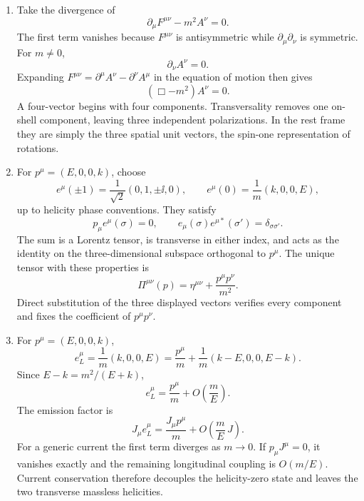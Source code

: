 \begin{enumerate}
\begin{enumerate}
\item
Take the divergence of
\[
 \partial_\mu F^{\mu\nu}-m^2A^\nu=0.
\]
The first term vanishes because \(F^{\mu\nu}\) is antisymmetric while
\(\partial_\mu\partial_\nu\) is symmetric.  For \(m\ne0\),
\[
 \partial_\nu A^\nu=0.
\]
Expanding \(F^{\mu\nu}=\partial^\mu A^\nu-\partial^\nu A^\mu\) in the
equation of motion then gives
\[
 (\Box-m^2)A^\nu=0.
\]
A four-vector begins with four components.  Transversality removes one
on-shell component, leaving three independent polarizations.  In the rest
frame they are simply the three spatial unit vectors, the spin-one
representation of rotations.
\item
For \(p^\mu=(E,0,0,k)\), choose
\[
 e^\mu(\pm1)=\frac1{\sqrt2}(0,1,\pm \ii,0),\qquad
 e^\mu(0)=\frac1m(k,0,0,E),
\]
up to helicity phase conventions.  They satisfy
\[
 p_\mu e^\mu(\sigma)=0,\qquad
 e_\mu(\sigma)e^{\mu *}(\sigma')=\delta_{\sigma\sigma'}.
\]
The sum is a Lorentz tensor, is transverse in either index, and acts as the
identity on the three-dimensional subspace orthogonal to \(p^\mu\).
The unique tensor with these properties is
\[
 \Pi^{\mu\nu}(p)=\eta^{\mu\nu}+\frac{p^\mu p^\nu}{m^2}.
\]
Direct substitution of the three displayed vectors verifies every
component and fixes the coefficient of \(p^\mu p^\nu\).
\item
For \(p^\mu=(E,0,0,k)\),
\[
 e_L^\mu=\frac1m(k,0,0,E)
 =\frac{p^\mu}{m}
 +\frac1m(k-E,0,0,E-k).
\]
Since \(E-k=m^2/(E+k)\),
\[
 e_L^\mu=\frac{p^\mu}{m}+O\!\left(\frac mE\right).
\]
The emission factor is
\[
 J_\mu e_L^\mu=\frac{J_\mu p^\mu}{m}
 +O\!\left(\frac mE\,J\right).
\]
For a generic current the first term diverges as \(m\to0\).  If
\(p_\mu J^\mu=0\), it vanishes exactly and the remaining longitudinal
coupling is \(O(m/E)\).  Current conservation therefore decouples the
helicity-zero state and leaves the two transverse massless helicities.
\end{enumerate}


\end{enumerate}
